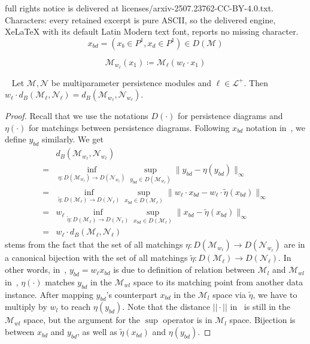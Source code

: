 \documentclass[10pt,a4paper]{amsart}
\def\M {{\mathcal{M}}}
\def\N {{\mathcal{N}}}
\def\parax{x_1}
\begin{document}
full rights notice is delivered at licenses/arxiv-2507.23762-CC-BY-4.0.txt. Characters: every retained excerpt is pure ASCII, so the delivered engine, XeLaTeX with its default Latin Modern text font, reports no missing character.
\begin{equation}
x_{bd}=(x_b\in P^1, x_d\in P^1)\in D(\mathcal{M})\label{eq:xbd}\end{equation}

\begin{equation}
  \M_{w_\ell}(\parax)\coloneqq \M_{\ell}(w_\ell\cdot \parax)\label{eq:module_stretch}
\end{equation}

\begin{lemma}~\label{lem:weight_translation}
Let $\M,\N$ be multiparameter persistence modules and $\ell\in\mathcal{L}^+$.
Then  $w_\ell\cdot d_B(\M_\ell,\N_\ell)=d_B(\M_{w_\ell},\N_{w_\ell})$.
\end{lemma}

\begin{proof}
Recall that we use the notations $D(\cdot)$ for  persistence diagrams and $\eta(\cdot)$ for matchings between persistence diagrams. Following $x_{bd}$ notation in~, we define $y_{bd}$ similarly.
We get
\begin{align}
&d_B(\M_{w_\ell},\N_{w_\ell}) \nonumber\\
  =& \inf_{\eta:D(\M_{w_\ell})\rightarrow D(\N_{w_\ell})} \sup_{y_{bd}\in D(\M_{w_\ell})} \lVert y_{bd} - \eta(y_{bd}) \rVert_\infty \\
  =& \inf_{\tilde\eta:D(\M_\ell)\rightarrow D(\N_\ell)} \sup_{x_{bd}\in D(\M_{\ell})} \lVert w_\ell\cdot x_{bd} - w_\ell\cdot \tilde\eta(x_{bd}) \rVert_\infty \label{eq:switch_diagram}\\
  =& w_\ell  \inf_{\tilde\eta:D(\M_\ell)\rightarrow D(\N_\ell)} \sup_{x_{bd}\in D(\M_\ell)}  \lVert x_{bd} - \tilde\eta(x_{bd}) \rVert_\infty\\
  =& w_\ell \cdot d_B(\M_\ell,\N_\ell)
\end{align}
 stems from the fact that the set of all matchings 
$\eta:D(\M_{w_\ell})\rightarrow D(\N_{w_\ell})$ 
are in a canonical bijection with the set of all matchings 
$\tilde\eta:D(\M_{\ell})\rightarrow D(\N_{\ell})$.
In other words, in~, $y_{bd}=w_{\ell}x_{bd}$ is due to definition of relation between $\mathcal{M}_{l}$ and $\mathcal{M}_{wl}$ in~, $\eta(\cdot)$ matches $y_{bd}$ in the $\mathcal{M}_{wl}$ space to its matching point from another data instance. 
After mapping $y_{bd}$'s counterpart $x_{bd}$ in the $\mathcal{M}_l$ space via $\tilde{\eta}$, we have to multiply by $w_l$ to reach $\eta(y_{bd})$. 
Note that the distance $||\cdot||$ in~ is still in the $\mathcal{M}_{wl}$ space, but the argument for the $\sup$ operator is in $\mathcal{M}_l$ space. Bijection is between $x_{bd}$ and $y_{bd}$, as well as $\tilde{\eta}(x_{bd})$ and $\eta(y_{bd})$.
\end{proof}
\end{document}
